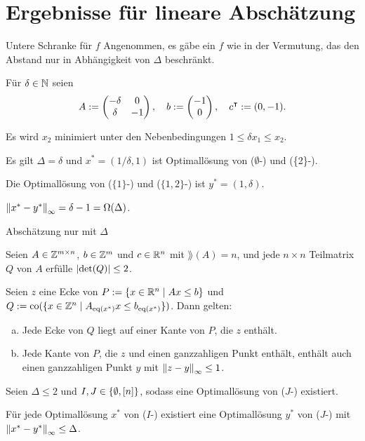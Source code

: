 \section{Ergebnisse für lineare Abschätzung}

\begin{frame}{Untere Schranke für $f$}
	Angenommen, es gäbe ein $f$ wie in der Vermutung, das den Abstand nur in Abhängigkeit von $\Delta$ beschränkt.
	
	\begin{beispiel}
	Für $\delta\in\mathbb{N}$ seien
	$$A:=
	\begin{pmatrix}
	-\delta & 0  \\
	\delta  & -1
	\end{pmatrix},\quad
	b:=\begin{pmatrix} -1 \\ 0 \end{pmatrix},\quad
	c^\intercal:=(0, -1).
	$$
	
	\pause
	Es wird $x_2$ minimiert unter den Nebenbedingungen $1\leq\delta x_1\leq x_2$.
	
	\pause
	Es gilt $\Delta=\delta$ und $x^*=(1/\delta,1)$ ist Optimallösung von ($\emptyset$-\MIPI) und (\{2\}-\MIPI).
	
	\pause
	Die Optimallösung von ($\{1\}$-\MIPI) und ($\{1, 2\}$-\MIPI) ist $y^*=(1,\delta)$.
	
	\pause
	$\left\lVert x^*-y^*\right\rVert_\infty=\delta-1=\Omega(\Delta)$.
	\end{beispiel}
\end{frame}

\begin{frame}{Abschätzung nur mit $\Delta$} 
	\begin{lemma}\label{lem:veselov}
		Seien $A\in\mathbb{Z}^{m\times n}$, $b\in\mathbb{Z}^m$ und $c\in\mathbb{R}^n$ mit $\rang(A)=n$, und jede $n\times n$ Teilmatrix $Q$ von $A$ erfülle $\lvert \det(Q) \rvert\leq 2$.
		
		Seien $z$ eine Ecke von $P:=\{x\in\mathbb{R}^n\mid Ax\leq b \}$ und $Q:=\operatorname{co}(\{x\in\mathbb{Z}^n \mid A_{\operatorname{eq}(x^*)}x \leq b_{\operatorname{eq}(x^*)} \})$.
		Dann gelten:
		\begin{enumerate}[(a)]
			\item Jede Ecke von $Q$ liegt auf einer Kante von $P$, die $z$ enthält.
			\item Jede Kante von $P$, die $z$ und einen ganzzahligen Punkt enthält, enthält auch einen ganzzahligen Punkt $y$ mit $\left\lVert z -y\right\rVert_\infty\leq 1$.
		\end{enumerate}
	\end{lemma}
	\pause
	\begin{theorem}
		Seien $\Delta\leq 2$ und $I,J\in\{\emptyset,[n]\}$, sodass eine Optimallösung von ($J$-\MIPI) existiert.
		
		Für jede Optimallösung $x^*$ von ($I$-\MIPI) existiert eine Optimallösung $y^*$ von ($J$-\MIPI) mit $\left\lVert x^*-y^*\right\rVert_\infty\leq \Delta$.
	\end{theorem}
\end{frame}